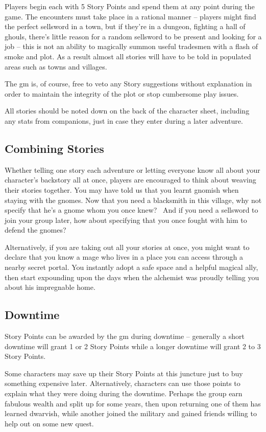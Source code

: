 \begin{multicols}{2}

Players begin each with 5 Story Points and spend them at any point during the game. The encounters must take place in a rational manner -- players might find the perfect sellsword in a town, but if they're in a dungeon, fighting a hall of ghouls, there's little reason for a random sellsword to be present and looking for a job -- this is not an ability to magically summon useful tradesmen with a flash of smoke and plot. As a result almost all stories will have to be told in populated areas such as towns and villages.

The \gls{gm} is, of course, free to veto any Story suggestions without explanation in order to maintain the integrity of the plot or stop cumbersome play issues.

All stories should be noted down on the back of the character sheet, including any stats from companions, just in case they enter during a later adventure.

\subsection{Combining Stories}

Whether telling one story each adventure or letting everyone know all about your character's backstory all at once, players are encouraged to think about weaving their stories together. You may have told us that you learnt gnomish when staying with the gnomes. Now that you need a blacksmith in this village, why not specify that he's a gnome whom you once knew? \ And if you need a sellsword to join your group later, how about specifying that you once fought with him to defend the gnomes?

Alternatively, if you are taking out all your stories at once, you might want to declare that you know a mage who lives in a place you can access through a nearby secret portal. You instantly adopt a safe space and a helpful magical ally, then start expounding upon the days when the alchemist was proudly telling you about his impregnable home.


\subsection{Downtime}

Story Points can be awarded by the \gls{gm} during \gls{downtime} -- generally a short downtime will grant 1 or 2 Story Points while a longer downtime will grant 2 to 3 Story Points.

Some characters may save up their Story Points at this juncture just to buy something expensive later.  Alternatively, characters can use those points to explain what they were doing during the \gls{downtime}.  Perhaps the group earn fabulous wealth and split up for some years, then upon returning one of them has learned dwarvish, while another joined the military and gained friends willing to help out on some new quest.

\end{multicols}

